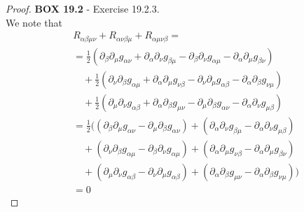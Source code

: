 \documentclass[11pt]{article}
\theoremstyle{definition}
\begin{document}
\cleardoublepage
\begin{proof}{\textbf{BOX 19.2} - Exercise 19.2.3.}\\
We note that
\begin{align*}
    &R_{\alpha\beta\mu\nu} + R_{\alpha\nu\beta\mu} + R_{\alpha\mu\nu\beta} =\\
    &=\frac{1}{2}(
    \partial_{\beta}\partial_{\mu}g_{\alpha\nu}
    + \partial_{\alpha}\partial_{\nu}g_{\beta\mu}
    - \partial_{\beta}\partial_{\nu}g_{\alpha\mu}
    - \partial_{\alpha}\partial_{\mu}g_{\beta\nu})\\
    &\quad + \frac{1}{2}(
    \partial_{\nu}\partial_{\beta}g_{\alpha\mu}
    + \partial_{\alpha}\partial_{\mu}g_{\nu\beta}
    - \partial_{\nu}\partial_{\mu}g_{\alpha\beta}
    - \partial_{\alpha}\partial_{\beta}g_{\nu\mu})\\
    &\quad + \frac{1}{2}(
    \partial_{\mu}\partial_{\nu}g_{\alpha\beta}
    + \partial_{\alpha}\partial_{\beta}g_{\mu\nu}
    - \partial_{\mu}\partial_{\beta}g_{\alpha\nu}
    - \partial_{\alpha}\partial_{\nu}g_{\mu\beta})\\
    &=\frac{1}{2}(
    (\partial_{\beta}\partial_{\mu}g_{\alpha\nu}
    - \partial_{\mu}\partial_{\beta}g_{\alpha\nu})
    + (\partial_{\alpha}\partial_{\nu}g_{\beta\mu}
    - \partial_{\alpha}\partial_{\nu}g_{\mu\beta})\\
    &\quad
    + (\partial_{\nu}\partial_{\beta}g_{\alpha\mu}
    - \partial_{\beta}\partial_{\nu}g_{\alpha\mu})
    + (\partial_{\alpha}\partial_{\mu}g_{\nu\beta}
    - \partial_{\alpha}\partial_{\mu}g_{\beta\nu})\\
    &\quad + 
    (\partial_{\mu}\partial_{\nu}g_{\alpha\beta}
    - \partial_{\nu}\partial_{\mu}g_{\alpha\beta})
    + (\partial_{\alpha}\partial_{\beta}g_{\mu\nu}
    - \partial_{\alpha}\partial_{\beta}g_{\nu\mu}))\\
    &= 0
\end{align*}

\end{proof}
\end{document}
